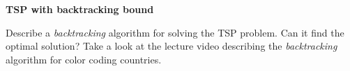 \usepackage{pdfpages}
\question \textbf{TSP with backtracking bound}

Describe a \textit{backtracking} algorithm for solving the TSP problem. Can it find the optimal solution? Take a look at the lecture video describing the \textit{backtracking} algorithm for color coding countries.


\begin{solution}



\end{solution}

